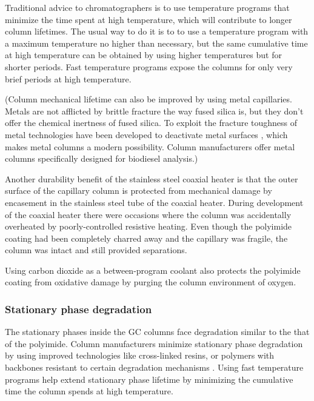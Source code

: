 Traditional advice to chromatographers is to use temperature programs that
minimize the time spent at high temperature, which will contribute to longer
column lifetimes. The usual way to do it is to to use a temperature program with
a maximum temperature no higher than necessary, but the same cumulative time at
high temperature can be obtained by using higher temperatures but for shorter
periods. Fast temperature programs expose the columns for only very brief
periods at high temperature.

(Column mechanical lifetime can also be improved by using metal capillaries.
Metals are not afflicted by brittle fracture the way fused silica is, but they
don't offer the chemical inertness of fused silica. To exploit the fracture
toughness of metal technologies have been developed to deactivate metal surfaces
\autocite{Smith2002}, which makes metal columns a modern possibility. Column
manufacturers offer metal columns specifically designed for biodiesel analysis.)

Another durability benefit of the stainless steel coaxial heater is that the
outer surface of the capillary column is protected from mechanical damage by
encasement in the stainless steel tube of the coaxial heater. During development
of the coaxial heater there were occasions where the column was accidentally
overheated by poorly-controlled resistive heating. Even though the polyimide
coating had been completely charred away and the capillary was fragile, the
column was intact and still provided separations.

Using carbon dioxide as a between-program coolant also protects the polyimide
coating from oxidative damage by purging the column environment of oxygen.

\subsubsection{Stationary phase degradation}

The stationary phases inside the GC columns face degradation similar to the that
of the polyimide. Column manufacturers minimize sta\-tion\-ary phase degradation
by using improved technologies like cross-linked resins, or polymers with
backbones resistant to certain degradation mechanisms \autocite{Day2003}.
Using fast temperature programs help extend stationary phase lifetime by
minimizing the cumulative time the column spends at high temperature.

